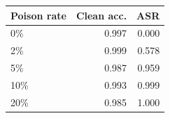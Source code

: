 \begin{tabular}{lrr}
\toprule
Poison rate & Clean acc. & ASR \\
\midrule
0\% & 0.997 & 0.000 \\
2\% & 0.999 & 0.578 \\
5\% & 0.987 & 0.959 \\
10\% & 0.993 & 0.999 \\
20\% & 0.985 & 1.000 \\
\bottomrule
\end{tabular}
